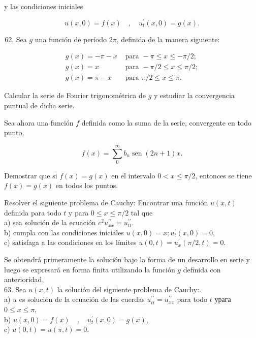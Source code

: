 \documentclass[10pt]{article}
\theoremstyle{plain}
\theoremstyle{definition}
\theoremstyle{remark}
\begin{document}
y las condiciones iniciales

$$
u(x, 0)=f(x) \quad, \quad u_{t}^{\prime}(x, 0)=g(x) .
$$

\begin{enumerate}
  \setcounter{enumi}{61}
  \item Sea $g$ una función de período $2 \pi$, definida de la manera siguiente:
\end{enumerate}

$$
\begin{array}{ll}
g(x)=-\pi-x & \text { para }-\pi \leqslant x \leqslant-\pi / 2 ; \\
g(x)=x & \text { para }-\pi / 2 \leqslant x \leqslant \pi / 2 ; \\
g(x)=\pi-x & \text { para } \pi / 2 \leqslant x \leqslant \pi .
\end{array}
$$

Calcular la serie de Fourier trigonométrica de $g$ y estudiar la convergencia puntual de dicha serie.

Sea ahora una función $f$ definida como la suma de la serie, convergente en todo punto,

$$
f(x)=\sum_{0}^{\infty} b_{n} \operatorname{sen}(2 n+1) x .
$$

Demostrar que si $f(x)=g(x)$ en el intervalo $0<x \leqslant \pi / 2$, entonces se tiene $f(x)=g(x)$ en todos los puntos.

Resolver el siguiente problema de Cauchy: Encontrar una función $u(x, t)$ definida para todo $t$ y para $0 \leqslant x \leqslant \pi / 2$ tal que\\
a) sea solución de la ecuación $c^{2} u_{x x}^{\prime \prime}=u_{t t}^{\prime \prime}$.\\
b) cumpla con las condiciones iniciales $u(x, 0)=x ; u_{t}^{\prime}(x, 0)=0$,\\
c) satisfaga a las condiciones en los límites $u(0, t)=u_{x}^{\prime}(\pi / 2, t)=0$.

Se obtendrá primeramente la solución bajo la forma de un desarrollo en serie y luego se expresará en forma finita utilizando la función $g$ definida con anterioridad,\\
63. Sea $u(x, t)$ la solución del siguiente problema de Cauchy:.\\
a) $u$ es solución de la ecuación de las cuerdas $u_{t t}^{\prime \prime}=u_{x x}^{\prime \prime}$ para todo $t$ урага $0 \leqslant x \leqslant \pi$,\\
b) $u(x, 0)=f(x) \quad, \quad u_{t}^{\prime}(x, 0)=g(x)$,\\
c) $u(0, t)=u(\pi, t)=0$.
\end{document}
